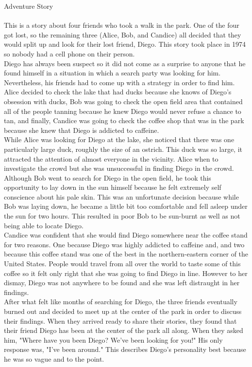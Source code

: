 \documentclass{article}
\begin{document}
\large{Adventure Story} \\ \\
This is a story about four friends who took a walk in the park. One of the four got lost, so the remaining three (Alice, Bob, and Candice) all decided that they would split up and look for their lost friend, Diego. This story took place in 1974 so nobody had a cell phone on their person.\\
Diego has always been suspect so it did not come as a surprise to anyone that he found himself in a situation in which a search party was looking for him. Nevertheless, his friends had to come up with a strategy in order to find him. Alice decided to check the lake that had ducks because she knows of Diego's obsession with ducks, Bob was going to check the open field area that contained all of the people tanning because he knew Diego would never refuse a chance to tan, and finally, Candice was going to check the coffee shop that was in the park because she knew that Diego is addicted to caffeine.\\
While Alice was looking for Diego at the lake, she noticed that there was one particularly large duck, roughly the size of an ostrich. This duck was so large, it attracted the attention of almost everyone in the vicinity. Alice when to investigate the crowd but she was unsuccessful in finding Diego in the crowd. \\
Although Bob went to search for Diego in the open field, he took this opportunity to lay down in the sun himself because he felt extremely self conscience about his pale skin. This was an unfortunate decision because while Bob was laying down, he became a little bit too comfortable and fell asleep under the sun for two hours. This resulted in poor Bob to be sun-burnt as well as not being able to locate Diego.\\
Candice was confident that she would find Diego somewhere near the coffee stand for two reasons. One because Diego was highly addicted to caffeine and, and two because this coffee stand was one of the best in the northern-eastern corner of the United States. People would travel from all over the world to taste some of this coffee so it felt only right that she was going to find Diego in line. However to her dismay, Diego was not anywhere to be found and she was left distraught in her findings.\\
After what felt like months of searching for Diego, the three friends eventually burned out and decided to meet up at the center of the park in order to discuss their findings. When they arrived ready to share their stories, they found that their friend Diego has been at the center of the park all along. When they asked him, "Where have you been Diego? We've been looking for you!" His only response was, "I've been around." This describes Diego's personality best because he was so vague and to the point.
\end{document}

